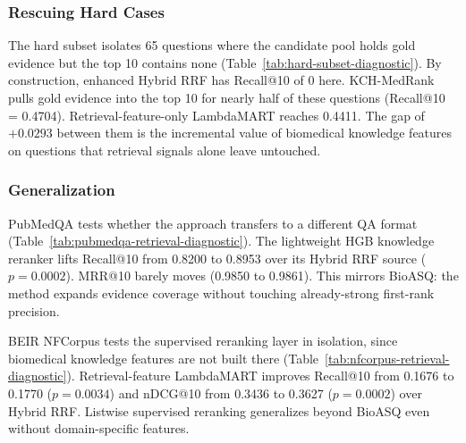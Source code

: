 \subsubsection{Rescuing Hard Cases}

The hard subset isolates 65 questions where the candidate pool holds gold evidence but the top 10 contains none (Table~\ref{tab:hard-subset-diagnostic}). By construction, enhanced Hybrid RRF has Recall@10 of 0 here. KCH-MedRank pulls gold evidence into the top 10 for nearly half of these questions (Recall@10 = 0.4704). Retrieval-feature-only LambdaMART reaches 0.4411. The gap of $+0.0293$ between them is the incremental value of biomedical knowledge features on questions that retrieval signals alone leave untouched.



\subsubsection{Generalization}

PubMedQA tests whether the approach transfers to a different QA format (Table~\ref{tab:pubmedqa-retrieval-diagnostic}). The lightweight HGB knowledge reranker lifts Recall@10 from 0.8200 to 0.8953 over its Hybrid RRF source ($p=0.0002$). MRR@10 barely moves (0.9850 to 0.9861). This mirrors BioASQ: the method expands evidence coverage without touching already-strong first-rank precision.



BEIR NFCorpus tests the supervised reranking layer in isolation, since biomedical knowledge features are not built there (Table~\ref{tab:nfcorpus-retrieval-diagnostic}). Retrieval-feature LambdaMART improves Recall@10 from 0.1676 to 0.1770 ($p=0.0034$) and nDCG@10 from 0.3436 to 0.3627 ($p=0.0002$) over Hybrid RRF. Listwise supervised reranking generalizes beyond BioASQ even without domain-specific features.


